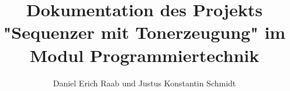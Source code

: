 \documentclass[12pt, a4paper, german]{article}
\title{Dokumentation des Projekts "Sequenzer mit Tonerzeugung" im Modul Programmiertechnik}
\author{Daniel Erich Raab und Justus Konstantin Schmidt}
\begin{document}
\def\startlcdtable{
	\begin{figure}[h]
	\ttfamily
	\centering
	\setlength{\tabcolsep}{2pt} %
	\begin{tabular}{|cccccccccccccccc|}
	\hline
}
\def\endlcdtable#1#2{
	\hline
	\end{tabular}
	\normalfont
	\caption{#1}
	\label{#2}
	\end{figure}
}

\newcommand{\lcdtext}[1] {\texttt{\framebox[1.1\width]{#1}}}

\newcommand{\source}[1] {\texttt{#1}}

\newcommand{\xydiagram}[3]{
	\begin{figure}[h]
	\centering
	\[
	\begin{xy}
	\xymatrix {
		#1
	}
	\end{xy}
	\]
	\caption{#2}
	\label{#3}
	\end{figure}
}


\maketitle
\tableofcontents





\end{document}
